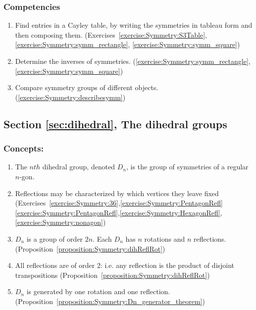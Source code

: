 \subsubsection*{Competencies}
\begin{enumerate}
\item
Find entries in a Cayley table, by writing the symmetries in tableau form and then composing them. (Exercises~\ref{exercise:Symmetry:S3Table},\ref{exercise:Symmetry:symm_rectangle}, \ref{exercise:Symmetry:symm_square})
\item
Determine the inverses of symmetries. (\ref{exercise:Symmetry:symm_rectangle},  \ref{exercise:Symmetry:symm_square})
\item
Compare symmetry groups of different objects. (\ref{exercise:Symmetry:describesymm})
\end{enumerate}


\subsection*{Section \ref{sec:dihedral}, The dihedral groups}
\subsubsection*{Concepts:}
\begin{enumerate}
\item 
The $nth$ dihedral group, denoted $D_n$, is the group of symmetries of a regular $n$-gon.
\item
Reflections may be characterized by which vertices they leave fixed (Exercises~\ref{exercise:Symmetry:36},\ref{exercise:Symmetry:PentagonRefl}\ref{exercise:Symmetry:PentagonRefl},\ref{exercise:Symmetry:HexagonRefl},\ref{exercise:Symmetry:nonagon}) 
\item
$D_n$ is a group of order $2n$.  Each $D_n$ has $n$ rotations and $n$ reflections. (Proposition~\ref{proposition:Symmetry:dihReflRot})
\item
All reflections are of order 2: i.e. any reflection is the product of disjoint transpositions (Proposition~\ref{proposition:Symmetry:dihReflRot})

\item
$D_n$ is generated by one rotation and one reflection.  (Proposition~\ref{proposition:Symmetry:Dn_generator_theorem})
\end{enumerate}


